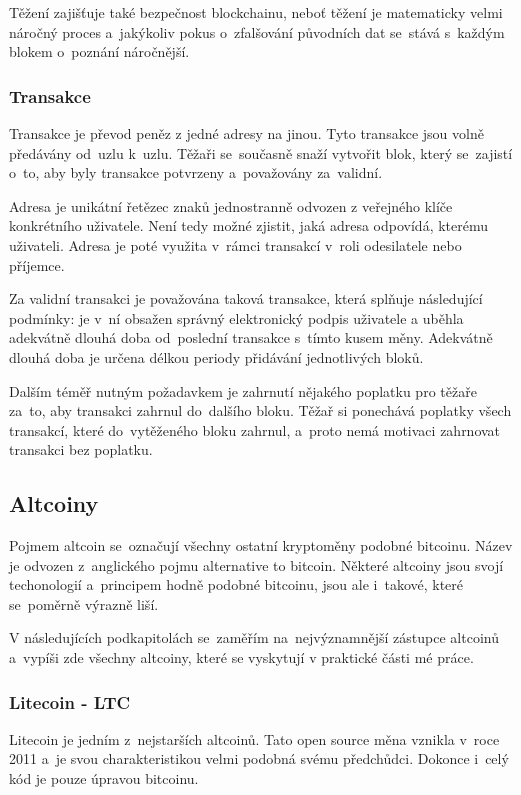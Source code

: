 \documentclass[thesis=B,czech]{FITthesis}[2019/03/21]
\begin{document}
Těžení zajišťuje také bezpečnost blockchainu, neboť těžení je matematicky velmi náročný proces a~jakýkoliv pokus o~zfalšování původních dat se~stává s~každým blokem o~poznání náročnější. \cite{mastering_bitcoin}

\subsubsection{Transakce}
Transakce je převod peněz z jedné adresy na jinou. Tyto transakce jsou volně předávány od~uzlu k~uzlu. Těžaři se~současně snaží vytvořit blok, který se~zajistí o~to, aby byly transakce potvrzeny a~považovány za~validní.

Adresa je unikátní řetězec znaků jednostranně odvozen z veřejného klíče konkrétního uživatele. Není tedy možné zjistit, jaká adresa odpovídá, kterému uživateli. Adresa je poté využita v~rámci transakcí v~roli odesilatele nebo příjemce. \cite{mastering_bitcoin}

Za validní transakci je považována taková transakce, která splňuje \linebreak následující podmínky: je v~ní obsažen správný elektronický podpis uživatele a uběhla adekvátně dlouhá doba od~poslední transakce s~tímto kusem měny. Adekvátně dlouhá doba je určena délkou periody přidávání jednotlivých bloků. \cite{Finex_blockchain}

Dalším téměř nutným požadavkem je zahrnutí nějakého poplatku pro těžaře za~to, aby transakci zahrnul do~dalšího bloku. Těžař si ponechává poplatky všech transakcí, které do~vytěženého bloku zahrnul, a~proto nemá motivaci zahrnovat transakci bez poplatku. \cite{Finex_blockchain}

\subsection{Altcoiny}
Pojmem altcoin se~označují všechny ostatní kryptoměny podobné bitcoinu. Název je odvozen z~anglického pojmu alternative to bitcoin. Některé altcoiny jsou svojí techonologií a~principem hodně podobné bitcoinu, jsou ale i~takové, které se~poměrně výrazně liší. \cite{pecev}

V následujících podkapitolách se~zaměřím na~nejvýznamnější zástupce altcoinů a~vypíši zde všechny altcoiny, které se vyskytují v praktické části mé práce.

\subsubsection{Litecoin - LTC}
Litecoin je jedním z~nejstarších altcoinů. Tato open source měna vznikla v~roce 2011 a~je svou charakteristikou velmi podobná svému předchůdci. \cite{litecoin} Dokonce i~celý kód je pouze úpravou bitcoinu. \cite{alza_monero}
\end{document}
